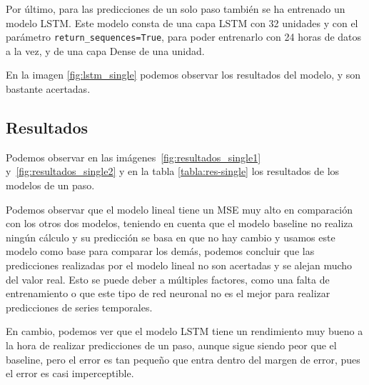 Por último, para las predicciones de un solo paso también se ha entrenado un modelo LSTM. Este modelo consta de una capa LSTM con 32 unidades y con el parámetro \texttt{return\_sequences=True}, para poder entrenarlo con 24 horas de datos a la vez, y de una capa Dense de una unidad.


En la imagen \ref{fig:lstm_single} podemos observar los resultados del modelo, y son bastante acertadas.


\subsection{Resultados}

Podemos observar en las imágenes~\ref{fig:resultados_single1} y~\ref{fig:resultados_single2} y en la tabla \ref{tabla:res-single} los resultados de los modelos de un paso.




Podemos observar que el modelo lineal tiene un MSE muy alto en comparación con los otros dos modelos, teniendo en cuenta que el modelo baseline no realiza ningún cálculo y su predicción se basa en que no hay cambio y usamos este modelo como base para comparar los demás, podemos concluir que las predicciones realizadas por el modelo lineal no son acertadas y se alejan mucho del valor real. Esto se puede deber a múltiples factores, como una falta de entrenamiento o que este tipo de red neuronal no es el mejor para realizar predicciones de series temporales.

\par

En cambio, podemos ver que el modelo LSTM tiene un rendimiento muy bueno a la hora de realizar predicciones de un paso, aunque sigue siendo peor que el baseline, pero el error es tan pequeño que entra dentro del margen de error, pues el error es casi imperceptible.

